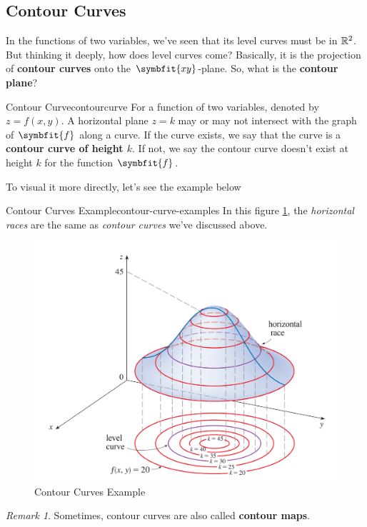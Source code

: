 \documentclass[math,code]{amznotes}
\theoremstyle{remark}
\newtheorem*{remark}{Remark}
\begin{document}
\subsection{Contour Curves}
In the functions of two variables, we've seen that its level curves must be in $\mathbb{R}^2$. But thinking it deeply, how does level curves come? Basically, it is the projection of \textbf{contour curves} onto the $\symbfit{xy}$-plane. So, what is the \textbf{contour plane}?
\begin{dfnbox}{Contour Curve}{contourcurve}
    For a function of two variables, denoted by $z=f(x,y)$. A horizontal plane $z=k$ may or may not intersect with the graph of $\symbfit{f}$ along a curve. If the curve exists, we say that the curve is a {\color{red} \textbf{contour curve of height $k$}}. If not, we say the contour curve doesn't exist at height $k$ for the function $\symbfit{f}$.
\end{dfnbox}
To visual it more directly, let's see the example below
\begin{exbox}{Contour Curves Example}{contour-curve-examples}
    In this figure \ref{fig:contour-curves-example}, the \textit{horizontal races} are the same as \textit{contour curves} we've discussed above.
    \begin{figure}[H]
        \centering
        \includegraphics[width=0.5\linewidth]{images/contour-curve-example.png}
        \caption{Contour Curves Example}
        \label{fig:contour-curves-example}
    \end{figure}
\end{exbox}
\begin{notebox}
    \begin{remark}
        Sometimes, contour curves are also called \textbf{contour maps}.
    \end{remark}
\end{notebox}
\end{document}
